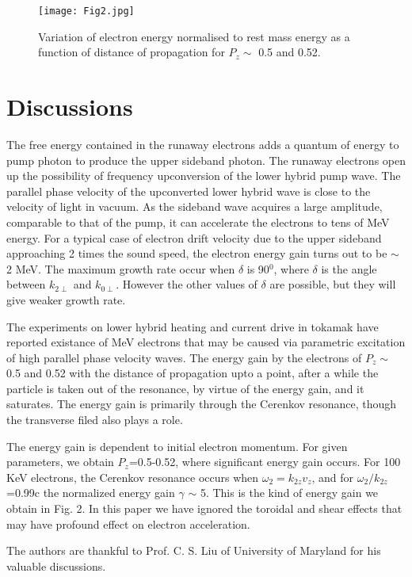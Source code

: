 \documentclass[aip,pop,amsmath,amssymb,showpacs,reprint,floatfix,lengthcheck]{revtex4-1}
\begin{document}
\begin{figure}
\centering
\texttt{[image: Fig2.jpg]}
\caption{\label{fig:epsart} Variation of electron energy normalised to rest mass energy as a function of distance of propagation for $P_{z}\sim$ 0.5 and 0.52.}
\end{figure}


\section{Discussions}

The free energy contained in the runaway electrons adds a quantum of energy to pump photon to produce the upper sideband photon. The runaway electrons open up the possibility of frequency upconversion of the lower hybrid pump wave. The parallel phase velocity of the upconverted lower hybrid wave is close to the velocity of light in vacuum. As the sideband wave acquires a large amplitude, comparable to that of the pump, it can accelerate the electrons to tens of MeV energy. For a typical case of electron drift velocity due to the upper sideband approaching 2 times the sound speed, the electron energy gain turns out to be $\sim$ 2 MeV. The maximum growth rate occur when $\delta$ is 90$^0$, where $\delta$ is the angle between $k_{2\perp}$ and $k_{0\perp}$. However the other values of $\delta$ are possible, but they will give weaker growth rate. 

The experiments on lower hybrid heating and current drive in tokamak have reported existance of MeV electrons that may be caused via parametric excitation of high parallel phase velocity waves. The energy gain by the electrons of $P_{z}\sim$ 0.5 and 0.52 with the distance of propagation upto a point, after a while the particle is taken out of the resonance, by virtue of the energy gain, and it saturates. The energy gain is primarily through the Cerenkov resonance, though the transverse filed also plays a role.

The energy gain is dependent to initial electron momentum. For given parameters, we obtain $P_{z}$=0.5-0.52, where significant energy gain occurs. For 100 KeV electrons, the Cerenkov resonance occurs when $\omega_{2}=k_{2z}v_{z}$, and for $\omega_{2}/k_{2z}$=0.99c the normalized energy gain $\gamma$ $\sim$ 5. This is the kind of energy gain we obtain in Fig. 2. 
In this paper we have ignored the toroidal and shear effects that may have profound effect on electron acceleration.

\begin{acknowledgments}
The authors are thankful to Prof. C. S. Liu of University of Maryland for his valuable discussions.
\end{acknowledgments}





















\nocite{*}
\end{document}

